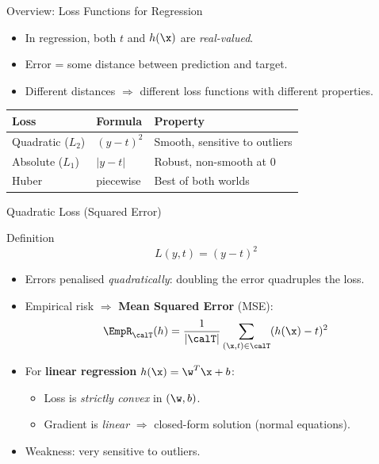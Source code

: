 \begin{frame}{Overview: Loss Functions for Regression}
  \begin{itemize}
    \item In regression, both $t$ and $h(\x)$ are \emph{real-valued}.
    \item Error = some distance between prediction and target.
    \item Different distances $\Rightarrow$ different loss functions with different properties.
  \end{itemize}

  \vspace{.5em}
  \begin{center}
  \begin{tabular}{lll}
    \toprule
    \textbf{Loss} & \textbf{Formula} & \textbf{Property} \\
    \midrule
    Quadratic ($L_2$) & $(y-t)^2$ & Smooth, sensitive to outliers \\
    Absolute ($L_1$)  & $|y-t|$   & Robust, non-smooth at 0 \\
    Huber             & piecewise & Best of both worlds \\
    \bottomrule
  \end{tabular}
  \end{center}
\end{frame}

\begin{frame}{Quadratic Loss (Squared Error)}
  \begin{block}{Definition}
    \[
      L(y,t) = (y-t)^2
    \]
  \end{block}

  \begin{itemize}
    \item Errors penalised \emph{quadratically}: doubling the error quadruples the loss.
    \item Empirical risk $\Rightarrow$ \textbf{Mean Squared Error} (MSE):
      \[
        \EmpR_{\calT}(h)=\frac{1}{|\calT|}\sum_{(\x,t)\in\calT}(h(\x)-t)^2
      \]
    \item For \textbf{linear regression} $h(\x)=\w^T\x+b$:
      \begin{itemize}
        \item Loss is \emph{strictly convex} in $(\w,b)$.
        \item Gradient is \emph{linear} $\Rightarrow$ closed-form solution (normal equations).
      \end{itemize}
    \item \alert{Weakness}: very sensitive to outliers.
  \end{itemize}
\end{frame}

